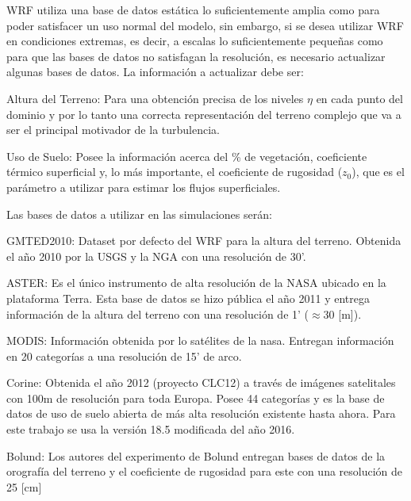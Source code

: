 WRF utiliza una base de datos estática lo suficientemente amplia como para poder satisfacer un uso normal del modelo, sin embargo, si se desea utilizar WRF en condiciones extremas, es decir, a escalas lo suficientemente pequeñas como para que las bases de datos no satisfagan la resolución, es necesario actualizar algunas bases de datos. La información a actualizar debe ser:
\begin{itemize*}
	\item Altura del Terreno: Para una obtención precisa de los niveles $\eta$ en cada punto del dominio y por lo tanto una correcta representación del terreno complejo que va a ser el principal motivador de la turbulencia.
	\item Uso de Suelo: Posee la información acerca del \% de vegetación, coeficiente térmico superficial y, lo más importante, el coeficiente de rugosidad ($z_0$), que es el parámetro a utilizar para estimar los flujos superficiales.
\end{itemize*}
Las bases de datos a utilizar en las simulaciones serán:
\begin{itemize*}
	\item GMTED2010: Dataset por defecto del WRF para la altura del terreno. Obtenida el año 2010 por la USGS y la NGA con una resolución de 30'.
	\item ASTER: Es el único instrumento de alta resolución de la NASA ubicado en la plataforma Terra. Esta base de datos se hizo pública el año 2011 y entrega información de la altura del terreno con una resolución de 1' ($\approx 30$ [m]).
	\item MODIS: Información obtenida por lo satélites de la nasa. Entregan información en 20 categorías a una resolución de 15' de arco.
	\item Corine: Obtenida el año 2012 (proyecto CLC12) a través de imágenes satelitales con 100m de resolución para toda Europa. Posee 44 categorías y es la base de datos de uso de suelo abierta de más alta resolución existente hasta ahora. Para este trabajo se usa la versión 18.5 modificada del año 2016.
	\item Bolund: Los autores del experimento de Bolund entregan bases de datos de la orografía del terreno y el coeficiente de rugosidad para este con una resolución de 25 [cm]
\end{itemize*}
